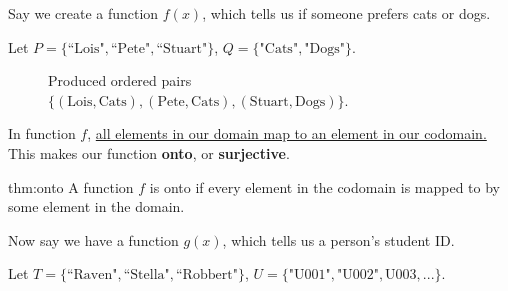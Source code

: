 \noindent
Say we create a function $f(x)$, which tells us if someone prefers cats or dogs.\\

\begin{center}
    Let $P=\{\text{``Lois"}, \text{``Pete"}, \text{``Stuart"}\}$, $Q=\{\text{"Cats"}, \text{"Dogs"}\}$.
\end{center}

\begin{figure}[ht]
    \centering
    \caption{\centering Produced ordered pairs $\{(\text{Lois},\text{Cats}),(\text{Pete},\text{Cats}),(\text{Stuart},\text{Dogs})\}$.}
    \label{fig:cats_dogs}
\end{figure}

\noindent
In function $f$, \underline{all elements in our domain map to an element in our
    codomain.} This makes our function \textbf{onto}, or \textbf{surjective}.\\

\begin{Def}{thm:onto}
    A function $f$ is onto if every element in the codomain is mapped to by some element in the domain.
\end{Def}

\newpage

\noindent
Now say we have a function $g(x)$, which tells us a person's student ID.\\
\begin{center}
    Let $T=\{\text{``Raven"}, \text{``Stella"}, \text{``Robbert"}\}$, $U=\{\text{"U001"}, \text{"U002"}, \text{U003}, ...\}$.
\end{center}

